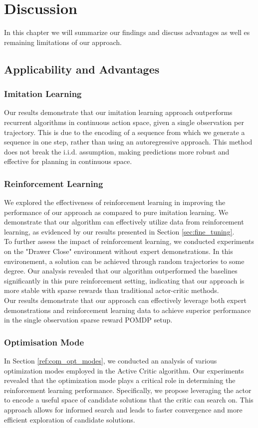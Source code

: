 
\chapter{Discussion}
\label{chapter:Discussion}
In this chapter we will summarize our findings and discuss advantages as well es remaining limitations of our approach.
\section{Applicability and Advantages}
\subsection{Imitation Learning}
Our results demonstrate that our imitation learning approach outperforms recurrent algorithms in continuous action space, 
given a single observation per trajectory. This is due to the encoding of a sequence from which we generate a sequence in one step, 
rather than using an autoregressive approach. This method does not break the i.i.d. assumption, making predictions more robust and effective 
for planning in continuous space. \\
\subsection{Reinforcement Learning}
We explored the effectiveness of reinforcement learning in improving the performance of our approach as compared to pure imitation learning. 
We demonstrate that our algorithm can effectively utilize data from reinforcement learning, as evidenced by our results presented in 
Section \ref{sec:fine_tuning}.\\
To further assess the impact of reinforcement learning, we conducted experiments on the "Drawer Close" environment without expert demonstrations. 
In this environement, a solution can be achieved through random trajectories to some degree. 
Our analysis revealed that our algorithm outperformed the baselines significantly in this pure reinforcement setting, 
indicating that our approach is more stable with sparse rewards than traditional actor-critic methods.\\
Our results demonstrate that our approach can effectively leverage both expert demonstrations and reinforcement learning data to achieve 
superior performance in the single observation sparse reward POMDP setup.

\subsection{Optimisation Mode}
In Section \ref{ref:com_opt_modes}, we conducted an analysis of various optimization modes employed in the Active Critic algorithm. 
Our experiments revealed that the optimization mode plays a critical role in determining the reinforcement learning performance. 
Specifically, we propose leveraging the actor to encode a useful space of candidate solutions that the critic can search on. 
This approach allows for informed search and leads to faster convergence and more efficient exploration of candidate solutions.

